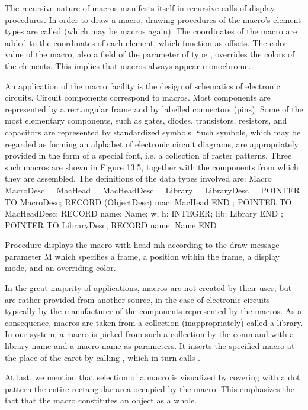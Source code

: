 The recursive nature of macros manifests itself in recursive calls of display procedures. In order to draw a macro, drawing procedures of the macro's element types are called (which may be macros again). The coordinates of the macro are added to the coordinates of each element, which function as offsets. The color value of the macro, also a field of the parameter of type , overrides the colors of the elements. This implies that macros always appear monochrome.

An application of the macro facility is the design of schematics of electronic circuits. Circuit components correspond to macros. Most components are represented by a rectangular frame and by labelled connectors (pins). Some of the most elementary components, such as gates, diodes, transistors, resistors, and capacitors are represented by standardized symbols. Such symbols, which may be regarded as forming an alphabet of electronic circuit diagrams, are appropriately provided in the form of a special font, i.e. a collection of raster patterns. Three such macros are shown in Figure 13.5, together with the components from which they are assembled. The definitions of the data types involved are:
\begintt
Macro = MacroDesc =
MacHead = MacHeadDesc =
Library = LibraryDesc =
POINTER TO MacroDesc;
RECORD (ObjectDesc) mac: MacHead END ;
POINTER TO MacHeadDesc; RECORD name: Name;
w, h: INTEGER; lib: Library END ;
POINTER TO LibraryDesc; RECORD name: Name END
\endtt

Procedure  displays the macro with head mh according to the draw message parameter M which specifies a frame, a position within the frame, a display mode, and an overriding color.

In the great majority of applications, macros are not created by their user, but are rather provided from another source, in the case of electronic circuits typically by the manufacturer of the components represented by the macros. As a consequence, macros are taken from a collection (inappropriately) called a library. In our system, a macro is picked from such a collection by the command  with a library name and a macro name as parameters. It inserts the specified macro at the place of the caret by calling , which in turn calls .

At last, we mention that selection of a macro is visualized by covering with a dot pattern the entire rectangular area occupied by the macro. This emphasizes the fact that the macro constitutes an object as a whole.

